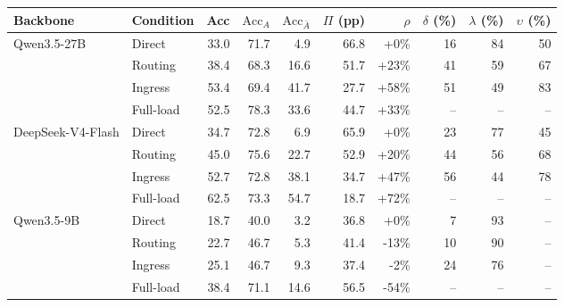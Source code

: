 \begin{tabular}{ll r rr r r r r r}
\toprule
Backbone & Condition & Acc & $\mathrm{Acc}_A$ & $\mathrm{Acc}_{\bar A}$ & $\Pi$ (pp) & $\rho$ & $\delta$ (\%) & $\lambda$ (\%) & $\upsilon$ (\%) \\
\midrule
Qwen3.5-27B & Direct & 33.0 & 71.7 & 4.9 & 66.8 & +0\% & 16 & 84 & 50 \\
 & Routing & 38.4 & 68.3 & 16.6 & 51.7 & +23\% & 41 & 59 & 67 \\
 & Ingress & 53.4 & 69.4 & 41.7 & 27.7 & +58\% & 51 & 49 & 83 \\
 & Full-load & 52.5 & 78.3 & 33.6 & 44.7 & +33\% & -- & -- & -- \\
\midrule
DeepSeek-V4-Flash & Direct & 34.7 & 72.8 & 6.9 & 65.9 & +0\% & 23 & 77 & 45 \\
 & Routing & 45.0 & 75.6 & 22.7 & 52.9 & +20\% & 44 & 56 & 68 \\
 & Ingress & 52.7 & 72.8 & 38.1 & 34.7 & +47\% & 56 & 44 & 78 \\
 & Full-load & 62.5 & 73.3 & 54.7 & 18.7 & +72\% & -- & -- & -- \\
\midrule
Qwen3.5-9B & Direct & 18.7 & 40.0 & 3.2 & 36.8 & +0\% & 7 & 93 & -- \\
 & Routing & 22.7 & 46.7 & 5.3 & 41.4 & -13\% & 10 & 90 & -- \\
 & Ingress & 25.1 & 46.7 & 9.3 & 37.4 & -2\% & 24 & 76 & -- \\
 & Full-load & 38.4 & 71.1 & 14.6 & 56.5 & -54\% & -- & -- & -- \\
\bottomrule
\end{tabular}